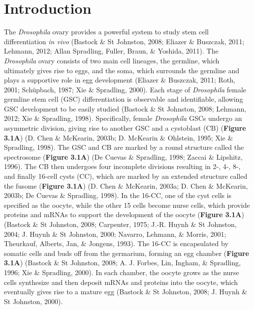\documentclass[12pt,oneside]{reedthesis}
\begin{document}
\hypertarget{introduction-2}{%
\section{Introduction}\label{introduction-2}}

The \emph{Drosophila} ovary provides a powerful system to study stem cell
differentiation \emph{in vivo} (Bastock \& St Johnston, 2008; Eliazer \& Buszczak, 2011; Lehmann, 2012; Allan Spradling, Fuller, Braun, \& Yoshida, 2011). The \emph{Drosophila} ovary consists of two main cell
lineages, the germline, which ultimately gives rise to eggs, and the
soma, which surrounds the germline and plays a supportive role in egg
development (Eliazer \& Buszczak, 2011; Roth, 2001; Schüpbach, 1987; Xie \& Spradling, 2000). Each stage of \emph{Drosophila} female germline stem cell (GSC)
differentiation is observable and identifiable, allowing GSC development
to be easily studied (Bastock \& St Johnston, 2008; Lehmann, 2012; Xie \& Spradling, 1998). Specifically, female
\emph{Drosophila} GSCs undergo an asymmetric division, giving rise to another
GSC and a cystoblast (CB) (\textbf{Figure 3.1A}) (D. Chen \& McKearin, 2003b; D. McKearin \& Ohlstein, 1995; Xie \& Spradling, 1998). The GSC and CB are marked by a round
structure called the spectrosome (\textbf{Figure 3.1A}) (De Cuevas \& Spradling, 1998; Zaccai \& Lipshitz, 1996). The CB then undergoes four incomplete divisions
resulting in 2-, 4-, 8-, and finally 16-cell cysts (CC), which are
marked by an extended structure called the fusome (\textbf{Figure 3.1A})
(D. Chen \& McKearin, 2003a; D. Chen \& McKearin, 2003b; De Cuevas \& Spradling, 1998). In the 16-CC, one of the
cyst cells is specified as the oocyte, while the other 15 cells become
nurse cells, which provide proteins and mRNAs to support the development
of the oocyte (\textbf{Figure 3.1A}) (Bastock \& St Johnston, 2008; Carpenter, 1975; J.-R. Huynh \& St Johnston, 2004; J. Huynh \& St Johnston, 2000; Navarro, Lehmann, \& Morris, 2001; Theurkauf, Alberts, Jan, \& Jongens, 1993). The 16-CC is encapsulated by
somatic cells and buds off from the germarium, forming an egg chamber
(\textbf{Figure 3.1A}) (Bastock \& St Johnston, 2008; A. J. Forbes, Lin, Ingham, \& Spradling, 1996; Xie \& Spradling, 2000). In each
chamber, the oocyte grows as the nurse cells synthesize and then deposit
mRNAs and proteins into the oocyte, which eventually gives rise to a
mature egg (Bastock \& St Johnston, 2008; J. Huynh \& St Johnston, 2000).
\end{document}
